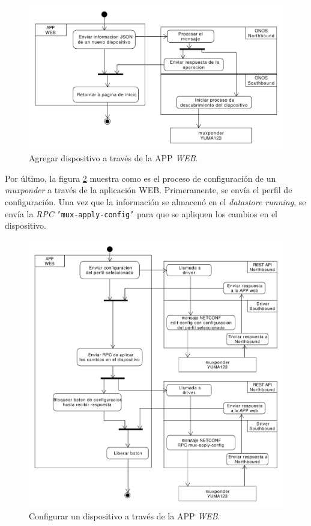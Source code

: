 \begin{itemize}
    \begin{figure}[H]
        \centering
        \includegraphics[scale=0.45]{Figures/agregar_disp_web.pdf}
        \caption{Agregar dispositivo a través de la APP \textit{WEB}.}
        \label{fig:agregar_disp_web}
      \end{figure}

    Por último, la figura \ref{fig:config_disp_web} muestra como es el proceso de configuración de un \textit{muxponder} a través de la aplicación WEB. Primeramente, se envía el perfil de configuración. Una vez que la información se almacenó en el \textit{datastore running}, se envía la \textit{RPC} \texttt{'mux-apply-config'} para que se apliquen los cambios en el dispositivo.

    \begin{figure}[H]
        \centering
        \includegraphics[scale=0.45]{Figures/config_disp_web.pdf}
        \caption{Configurar un dispositivo a través de la APP \textit{WEB}.}
        \label{fig:config_disp_web}
      \end{figure}


\end{itemize}
